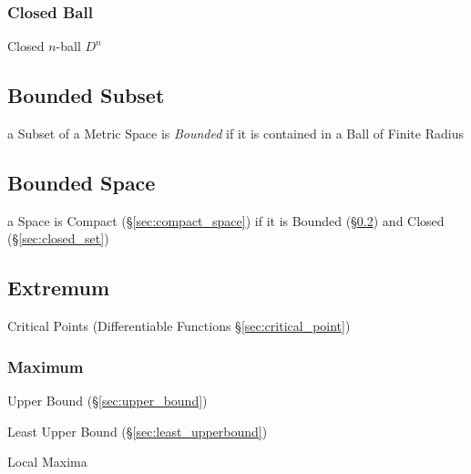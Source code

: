 \subsubsection{Closed Ball}\label{sec:closed_ball}

Closed $n$-ball $D^n$



\subsection{Bounded Subset}\label{sec:bounded_subset}

a Subset of a Metric Space is \emph{Bounded} if it is contained in a Ball of
Finite Radius



\subsection{Bounded Space}\label{sec:bounded_space}

a Space is Compact (\S\ref{sec:compact_space}) if it is Bounded
(\S\ref{sec:bounded_space}) and Closed (\S\ref{sec:closed_set})



\subsection{Extremum}\label{sec:extremum}

\fist Critical Points (Differentiable Functions \S\ref{sec:critical_point})



\subsubsection{Maximum}\label{sec:maximum}

Upper Bound (\S\ref{sec:upper_bound})

Least Upper Bound (\S\ref{sec:least_upperbound})

Local Maxima

